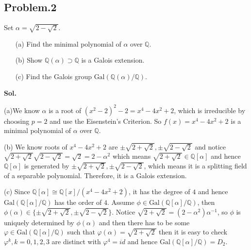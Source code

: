 \documentclass[lang=en,11pt,a4paper,citestyle =authoryear]{elegantpaper}
\begin{document}
\subsection*{Problem.2} 
Set $\alpha = \sqrt{2-\sqrt{2}}$.
\begin{enumerate}
    \item [(a)] Find the minimal polynomial of $\alpha$ over $\mathbb{Q}$.
    \item [(b)] Show $\mathbb{Q}(\alpha) \supset \mathbb{Q}$ is a Galois extension.
    \item [(c)] Find the Galois group $\text{Gal}(\mathbb{Q}(\alpha)/\mathbb{Q})$.
\end{enumerate}
\vspace{0.5em}
\textbf{Sol.} \par
   (a)We know $\alpha$ is a root of $(x^2-2)^2 - 2 = x^4 - 4x^2 +2$, which is irreducible by choosing $p=2$ and use the Eisenstein's Criterion. So $f(x) = x^4-4x^2 + 2$ is a minimal polynomial of $\alpha$ over $\mathbb{Q}$.\par
   (b) We know roots of $x^4-4x^2 +2$ are $\pm\sqrt{2+\sqrt{2}},\pm\sqrt{2-\sqrt{2}}$ and notice $\sqrt{2+\sqrt{2}}\sqrt{2-\sqrt{2}} = \sqrt{2} = 2-\alpha^2$ which means $\sqrt{2+\sqrt{2}} \in \mathbb{Q}[\alpha]$ and hence $\mathbb{Q}[\alpha]$ is generated by $\pm\sqrt{2+\sqrt{2}},\pm\sqrt{2-\sqrt{2}}$, which means it is a splitting field of a separable polynomial. Therefore, it is a Galois extension.\par
   (c) Since $\mathbb{Q}[\alpha]\cong \mathbb{Q}[x]/(x^4-4x^2+2)$, it has the degree of $4$ and hence $\text{Gal}(\mathbb{Q}[\alpha]/\mathbb{Q})$ has the order of $4$. Assume $\phi \in \text{Gal}(\mathbb{Q}[\alpha]/\mathbb{Q})$, then $\phi(\alpha) \in \{\pm\sqrt{2+\sqrt{2}},\pm\sqrt{2-\sqrt{2}}\}$. Notice $\sqrt{2+\sqrt{2}} = (2-\alpha^2)\alpha^{-1}$, so $\phi$ is uniquely determined by $\phi(\alpha)$ and then there has to be some $\varphi \in \text{Gal}(\mathbb{Q}[\alpha]/\mathbb{Q})$ such that $\varphi(\alpha) = \sqrt{2+\sqrt{2}}$ then it is easy to check $\varphi^k, k = 0, 1,2,3$ are distinct with $\varphi^4 = id$ and hence $\text{Gal}(\mathbb{Q}[\alpha]/\mathbb{Q}) = D_2$.
\par 
\vspace{0.5em}
\end{document}
